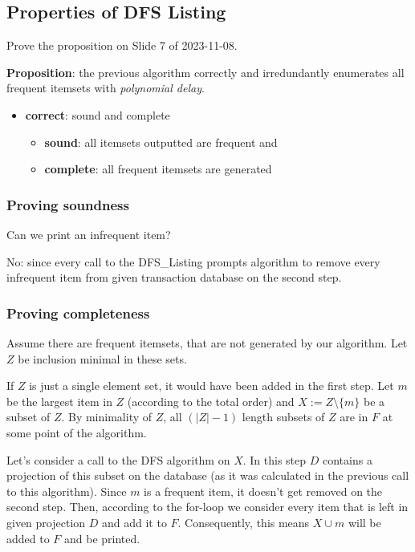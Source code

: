 \documentclass{article}
\begin{document}
  \subsection{Properties of DFS Listing}
  \begin{centerframebox}
    Prove the proposition on Slide 7 of 2023-11-08.

    \textbf{Proposition}: the previous algorithm correctly and irredundantly enumerates all
    frequent itemsets with \textit{polynomial delay}.
    \begin{itemize}
      \item \textbf{correct}: sound and complete
      \begin{itemize}
        \item \textbf{sound}: all itemsets outputted are frequent and
        \item \textbf{complete}: all frequent itemsets are generated
      \end{itemize}
    \end{itemize}
  \end{centerframebox}
  \subsubsection*{Proving soundness}
  Can we print an infrequent item?

  No: since every call to the DFS\_Listing prompts algorithm to remove every infrequent item from given transaction database on the second step.

  \subsubsection*{Proving completeness}
  Assume there are frequent itemsets, that are not generated by our algorithm.
  Let $Z$ be inclusion minimal in these sets.

  If $Z$ is just a single element set, it would have been added in the first step.
  Let $m$ be the largest item in $Z$ (according to the total order) and $X := Z \setminus \{m\}$ be a subset of $Z$.
  By minimality of $Z$, all $(|Z| - 1)$ length subsets of $Z$ are in $F$ at some point of the algorithm.

  Let's consider a call to the DFS algorithm on $X$.
  In this step $D$ contains a projection of this subset on the database (as it was calculated in the previous call to this algorithm).
  Since $m$ is a frequent item, it doesn't get removed on the second step.
  Then, according to the for-loop we consider every item that is left in given projection $D$ and add it to $F$.
  Consequently, this means $X \cup m$ will be added to $F$ and be printed.
\end{document}
